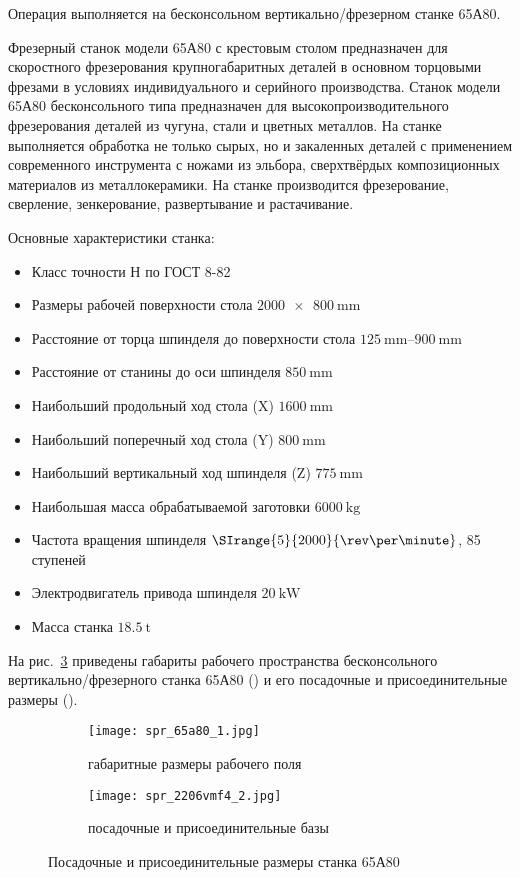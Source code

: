 \documentclass[14pt,russian,a4paper]{extreport}
\begin{document}
Операция выполняется на бесконсольном вертикально\-/фрезерном станке 65А80.

Фрезерный станок модели 65А80 с крестовым столом предназначен для скоростного фрезерования крупногабаритных деталей в основном торцовыми фрезами в условиях индивидуального и серийного производства. Станок модели 65А80 бесконсольного типа предназначен для высокопроизводительного фрезерования деталей из чугуна, стали и цветных металлов. На станке выполняется обработка не только сырых, но и закаленных деталей с применением современного инструмента с ножами из эльбора, сверхтвёрдых композиционных материалов из металлокерамики. На станке производится фрезерование, сверление, зенкерование, развертывание и растачивание.

Основные характеристики станка:
\begin{itemize}
	\item Класс точности Н по ГОСТ 8-82
	\item Размеры рабочей поверхности стола $\SI{2000 x 800}{\milli\meter}$
	\item Расстояние от торца шпинделя до поверхности стола $\SIrange{125}{900}{\milli\meter}$
	\item Расстояние от станины до оси шпинделя $\SI{850}{\milli\meter}$
	\item Наибольший продольный ход стола (X) $\SI{1600}{\milli\meter}$
	\item Наибольший поперечный ход стола (Y) $\SI{800}{\milli\meter}$
	\item Наибольший вертикальный ход шпинделя (Z) $\SI{775}{\milli\meter}$
	\item Наибольшая масса обрабатываемой заготовки $\SI{6000}{\kilo\gram}$
	\item Частота вращения шпинделя $\SIrange{5}{2000}{\rev\per\minute}$, 85 ступеней
	\item Электродвигатель привода шпинделя $\SI{20}{\kilo\watt}$
	\item Масса станка $\SI{18,5}{\tonne}$
\end{itemize}
 
На рис.~\ref{fig:65a80} приведены габариты рабочего пространства бесконсольного вертикально\-/фрезерного станка 65А80 () и его посадочные и присоединительные размеры ().

\begin{figure}[H]
	\centering
  \begin{subfigure}[b]{.50\textwidth}
    \centering
    \texttt{[image: spr\_65a80\_1.jpg]}
    \caption{габаритные размеры рабочего поля}
    \label{subfig:65a80a}
  \end{subfigure}%
  \begin{subfigure}[b]{.50\textwidth}
    \centering
    \texttt{[image: spr\_2206vmf4\_2.jpg]}
    \caption{посадочные и присоединительные базы}
    \label{subfig:65a80b}
  \end{subfigure}%
  \caption{Посадочные и присоединительные размеры станка 65А80}
  \label{fig:65a80}
\end{figure}
\end{document}
